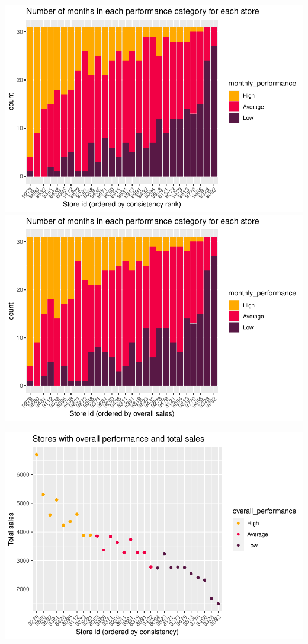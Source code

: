 \documentclass[
  11pt,
]{article}
\begin{document}
\includegraphics{Assignment-STAT702_files/figure-latex/promotion_plots-1.pdf}
\includegraphics{Assignment-STAT702_files/figure-latex/promotion_plots-2.pdf}

\includegraphics{Assignment-STAT702_files/figure-latex/unnamed-chunk-1-1.pdf}
\end{document}
